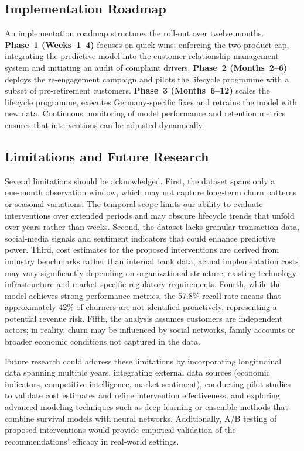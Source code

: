 \documentclass[12pt]{article}
\begin{document}
\subsection{Implementation Roadmap}
An implementation roadmap structures the roll‑out over twelve months.  \textbf{Phase~1 (Weeks~1–4)} focuses on quick wins: enforcing the two‑product cap, integrating the predictive model into the customer relationship management system and initiating an audit of complaint drivers.  \textbf{Phase~2 (Months~2–6)} deploys the re‑engagement campaign and pilots the lifecycle programme with a subset of pre‑retirement customers.  \textbf{Phase~3 (Months~6–12)} scales the lifecycle programme, executes Germany‑specific fixes and retrains the model with new data.  Continuous monitoring of model performance and retention metrics ensures that interventions can be adjusted dynamically.

\subsection{Limitations and Future Research}
Several limitations should be acknowledged.  First, the dataset spans only a one‑month observation window, which may not capture long‑term churn patterns or seasonal variations.  The temporal scope limits our ability to evaluate interventions over extended periods and may obscure lifecycle trends that unfold over years rather than weeks.  Second, the dataset lacks granular transaction data, social‑media signals and sentiment indicators that could enhance predictive power.  Third, cost estimates for the proposed interventions are derived from industry benchmarks rather than internal bank data; actual implementation costs may vary significantly depending on organizational structure, existing technology infrastructure and market‑specific regulatory requirements.  Fourth, while the model achieves strong performance metrics, the 57.8\% recall rate means that approximately 42\% of churners are not identified proactively, representing a potential revenue risk.  Fifth, the analysis assumes customers are independent actors; in reality, churn may be influenced by social networks, family accounts or broader economic conditions not captured in the data.

Future research could address these limitations by incorporating longitudinal data spanning multiple years, integrating external data sources (economic indicators, competitive intelligence, market sentiment), conducting pilot studies to validate cost estimates and refine intervention effectiveness, and exploring advanced modeling techniques such as deep learning or ensemble methods that combine survival models with neural networks.  Additionally, A/B testing of proposed interventions would provide empirical validation of the recommendations' efficacy in real‑world settings.
\end{document}
